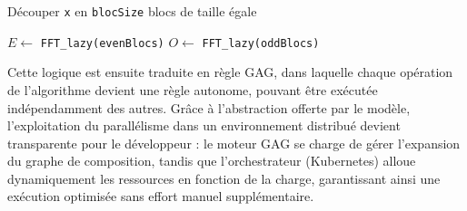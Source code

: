 



\begin{algorithm}[H]
\DontPrintSemicolon
{}


Découper \texttt{x} en \texttt{blocSize} blocs de taille égale\;


$E \gets$ \texttt{FFT\_lazy(evenBlocs)}\;
$O \gets$ \texttt{FFT\_lazy(oddBlocs)}\;


\caption{Algorithme FFT Paresseux}
\label{alg:lazy_fft}
\end{algorithm}

\vspace{1cm}

Cette logique est ensuite traduite en règle GAG, dans laquelle chaque opération de l’algorithme devient une règle autonome, pouvant être exécutée indépendamment des autres. 
Grâce à l’abstraction offerte par le modèle, l’exploitation du parallélisme dans un environnement distribué devient transparente pour le développeur :
le moteur GAG se charge de gérer l’expansion du graphe de composition, tandis que l’orchestrateur (Kubernetes) alloue dynamiquement les ressources en fonction de la charge, garantissant ainsi une exécution optimisée sans effort manuel supplémentaire.

